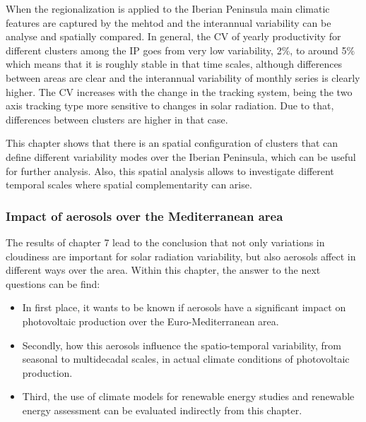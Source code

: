 When the regionalization is applied to the Iberian Peninsula main climatic features are captured by the mehtod and the interannual variability can be analyse and spatially compared. In general, the CV of yearly productivity for different clusters among the IP goes from very low variability, 2$\%$, to around 5$\%$ which means that it is roughly stable in that time scales, although differences between areas are clear and the interannual variability of monthly series is clearly higher. The CV increases with the change in the tracking system, being the two axis tracking type more sensitive to changes in solar radiation. Due to that, differences between clusters are higher in that case.

This chapter shows that there is an spatial configuration of clusters that can define different variability modes over the Iberian Peninsula, which can be useful for further analysis. Also, this spatial analysis allows to investigate different temporal scales where spatial complementarity can arise. %



\subsubsection{Impact of aerosols over the Mediterranean area}

The results of chapter 7 lead to the conclusion that not only variations in cloudiness are important for solar radiation variability, but also aerosols affect in different ways over the area. Within this chapter, the answer to the next questions can be find:

\begin{itemize}
  
\item In first place, it wants to be known if aerosols have a significant impact on photovoltaic production over the Euro-Mediterranean area.
\item Secondly, how this aerosols influence the spatio-temporal variability, from seasonal to multidecadal scales, in actual climate conditions of photovoltaic production.
\item Third, the use of climate models for renewable energy studies and renewable energy assessment can be evaluated indirectly from this chapter.
\end{itemize}

